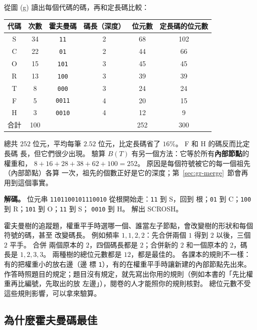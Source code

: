 從圖 (g) 讀出每個代碼的碼，再和定長碼比較：

\begin{center}
\begin{tabular}{cccccc}
\toprule
代碼 & 次數 & 霍夫曼碼 & 碼長（深度） & 位元數 & 定長碼的位元數 \\
\midrule
S & 34 & \texttt{11} & 2 & 68 & 102 \\
C & 22 & \texttt{01} & 2 & 44 & 66 \\
O & 15 & \texttt{101} & 3 & 45 & 45 \\
R & 13 & \texttt{100} & 3 & 39 & 39 \\
T & 8 & \texttt{000} & 3 & 24 & 24 \\
F & 5 & \texttt{0011} & 4 & 20 & 15 \\
H & 3 & \texttt{0010} & 4 & 12 & 9 \\
\midrule
合計 & 100 & & & 252 & 300 \\
\bottomrule
\end{tabular}
\end{center}

總共 $252$ 位元，平均每筆 $2.52$ 位元，比定長碼省了 $16\%$。 F 和 H 的碼反而比定長碼
長，但它們很少出現。 驗算 $B(T)$ 有另一個方法：它等於所有\textbf{內部節點}的權重和，
$8 + 16 + 28 + 38 + 62 + 100 = 252$。 原因是每個符號被它的每一個祖先（內部節點）各算
一次，祖先的個數正好是它的深度；第~\ref{sec:gr-merge}~節會再用到這個事實。

\textbf{解碼。} 位元串 \texttt{1101100101110010} 從根開始走：\texttt{11} 到 S，回到
根；\texttt{01} 到 C；\texttt{100} 到 R；\texttt{101} 到 O；\texttt{11} 到 S；
\texttt{0010} 到 H。 解出 SCROSH。

\begin{examnote}
霍夫曼樹的追蹤題，權重平手時選哪一個、誰當左子節點，會改變樹的形狀和每個符號的碼，甚至
改變碼長。 例如頻率 $1, 1, 2, 2$：先合併兩個 $1$ 得到 $2$ 以後，三個 $2$ 平手。 合併
兩個原本的 $2$，四個碼長都是 $2$；合併新的 $2$ 和一個原本的 $2$，碼長是 $1, 2, 3, 3$。
兩種樹的總位元數都是 $12$，都是最佳的。 各課本的規則不一樣：有的把權重小的放右邊（邊
標 \texttt{1}），有的在權重平手時讓新建的內部節點先出來。 作答時照題目的規定；題目沒有規定，就先寫出你用的規則（例如本書的「先比權重再比編號，先取出的放
左邊」），閱卷的人才能照你的規則核對。 總位元數不受這些規則影響，可以拿來驗算。
\end{examnote}

\subsection{為什麼霍夫曼碼最佳}
\label{sec:gr-huff-proof}

